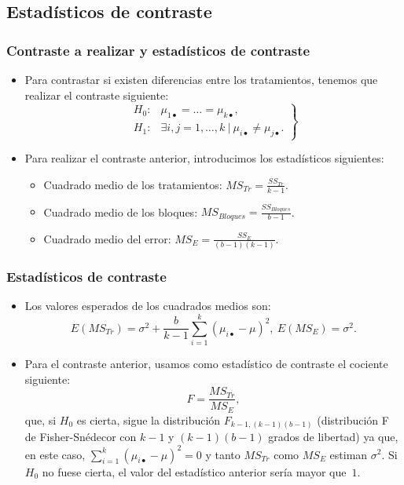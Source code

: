 \subsection{Estadísticos de contraste}
\begin{frame}
\frametitle{Contraste a realizar y estadísticos de contraste}
\begin{itemize}
\item<2-> Para contrastar si existen diferencias entre los tratamientos, tenemos que realizar el contraste siguiente:
\[
\left.
\begin{array}{rl}
H_0 : & \mu_{1\bullet}=\ldots =\mu_{k\bullet}, \\
H_1 : &\exists i,j=1,\ldots ,k\ |\ \mu_{i\bullet}\not = \mu_{j\bullet}.
\end{array}
\right\}
\]
\item<3-> Para realizar el contraste anterior, introducimos los estadísticos siguientes:
\begin{itemize}
\item<4-> Cuadrado medio de los tratamientos: $MS_{Tr}=\frac{SS_{Tr}}{k-1}$.
\item<5-> Cuadrado medio de los bloques: $MS_{Bloques}=\frac{SS_{Bloques}}{b-1}$.
\item<6-> Cuadrado medio del error: $MS_E = \frac{SS_E}{(b-1) (k-1)}$.
\end{itemize}
\end{itemize}
\end{frame}
\begin{frame}
\frametitle{Estadísticos de contraste}
\begin{itemize}
\item<2-> Los valores esperados de los cuadrados medios son:
\[
E(MS_{Tr})=\sigma^2 + \frac{b}{k-1}\sum_{i=1}^k (\mu_{i\bullet}-\mu)^2, \ E(MS_E)=\sigma^2.
\]
\item<3-> Para el contraste anterior, usamos como estadístico de contraste el cociente siguiente:
\[
F=\frac{MS_{Tr}}{MS_E},
\]
que, si $H_0$ es cierta, sigue la distribución $F_{k-1,(k-1) (b-1)}$ (distribución F de Fisher-Snédecor con $k-1$ y $(k-1) (b-1)$ grados de libertad) ya que, en este caso, $\sum_{i=1}^k (\mu_{i\bullet}-\mu)^2 =0$ y tanto $MS_{Tr}$ como $MS_E$ estiman $\sigma^2$. Si $H_0$ no fuese cierta, el valor del estadístico anterior sería mayor que~$1$.
\end{itemize}
\end{frame}


